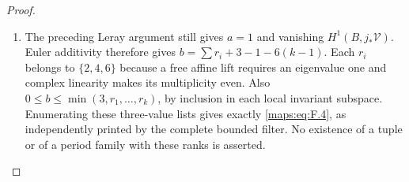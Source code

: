 \begin{proof}
\begin{enumerate}[label=\arabic*.]
\item The preceding Leray argument still gives $a=1$ and vanishing
$H^1(B,j_*\mathcal V)$.  Euler additivity therefore gives
$b=\sum r_i+3-1-6(k-1)$.  Each $r_i$ belongs to
$\{2,4,6\}$ because a free affine lift requires an eigenvalue
one and complex linearity makes its multiplicity even.
Also $0\leq b\leq\min(3,r_1,\ldots,r_k)$, by inclusion in
each local invariant subspace.  Enumerating these three-value
lists gives exactly \eqref{maps:eq:F.4}, as independently printed by the
complete bounded filter.  No existence of a tuple or of a
period family with these ranks is asserted.

\end{enumerate}
\end{proof}




